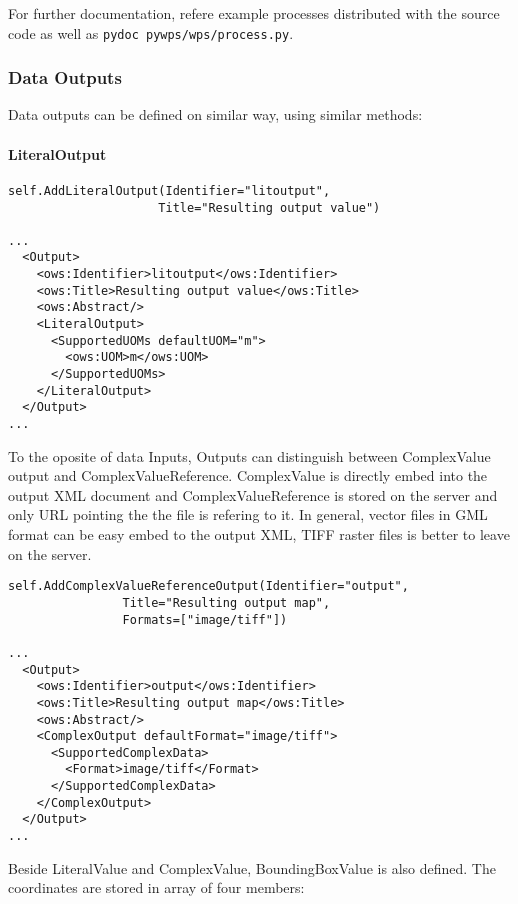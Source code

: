\documentclass[a4paper,11pt]{article}
\begin{document}
For further documentation, refere example processes distributed with the
source code as well as \texttt{pydoc~pywps/wps/process.py}. 


\subsubsection{Data Outputs}
    
Data outputs can be defined on similar way, using similar methods:

\paragraph{LiteralOutput}
\begin{verbatim}
self.AddLiteralOutput(Identifier="litoutput",
                     Title="Resulting output value")

...
  <Output>
    <ows:Identifier>litoutput</ows:Identifier>
    <ows:Title>Resulting output value</ows:Title>
    <ows:Abstract/>
    <LiteralOutput>
      <SupportedUOMs defaultUOM="m">
        <ows:UOM>m</ows:UOM>
      </SupportedUOMs>
    </LiteralOutput>
  </Output>
...
\end{verbatim}

To the oposite of data Inputs, Outputs can distinguish between ComplexValue
output and ComplexValueReference. ComplexValue is directly embed into the
output XML document and ComplexValueReference is stored on the server and
only URL pointing the the file is refering to it. In general, vector files
in GML format can be easy embed to the output XML, TIFF raster files is
better to leave on the server.

\begin{verbatim}
self.AddComplexValueReferenceOutput(Identifier="output",
                Title="Resulting output map",
                Formats=["image/tiff"])

...
  <Output>
    <ows:Identifier>output</ows:Identifier>
    <ows:Title>Resulting output map</ows:Title>
    <ows:Abstract/>
    <ComplexOutput defaultFormat="image/tiff">
      <SupportedComplexData>
        <Format>image/tiff</Format>
      </SupportedComplexData>
    </ComplexOutput>
  </Output>
...
\end{verbatim}

Beside LiteralValue and ComplexValue, BoundingBoxValue is also defined. The
coordinates are stored in array of four members:
\end{document}
